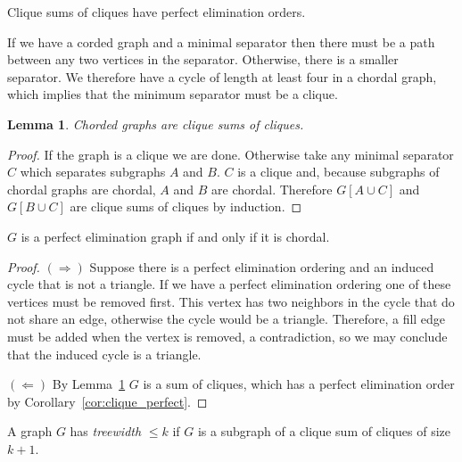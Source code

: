 \documentclass{article}
\newtheorem{lemma}{Lemma}
\begin{document}
\begin{corollary}\label{cor:clique_perfect}
    Clique sums of cliques have perfect elimination orders.
\end{corollary}

If we have a corded graph and a minimal separator then there must be a path between any two vertices in the separator.
Otherwise, there is a smaller separator.
We therefore have a cycle of length at least four in a chordal graph, which implies that the minimum separator must be a clique.

\begin{lemma}\label{lem:chord_sums}
    Chorded graphs are clique sums of cliques.
\end{lemma}
\begin{proof}
    If the graph is a clique we are done.
    Otherwise take any minimal separator $C$ which separates subgraphs $A$ and $B$.
    $C$ is a clique and, because subgraphs of chordal graphs are chordal, $A$ and $B$ are chordal.
    Therefore $G[A\cup C]$ and $G[B\cup C]$ are clique sums of cliques by induction.
\end{proof}

\begin{theorem}
    $G$ is a perfect elimination graph if and only if it is chordal.
\end{theorem}
\begin{proof}
    \noindent
    $(\Rightarrow)$ Suppose there is a perfect elimination ordering and an induced cycle that is not a triangle.
    If we have a perfect elimination ordering one of these vertices must be removed first.
    This vertex has two neighbors in the cycle that do not share an edge, otherwise the cycle would be a triangle.
    Therefore, a fill edge must be added when the vertex is removed, a contradiction, so we may conclude that the induced cycle is a triangle.

    \noindent
    $(\Leftarrow)$ By Lemma~\ref{lem:chord_sums} $G$ is a sum of cliques, which has a perfect elimination order by Corollary~\ref{cor:clique_perfect}.
\end{proof}

\begin{definition}
    A graph $G$ has \emph{treewidth} $\leq k$ if $G$ is a subgraph of a clique sum of cliques of size $k+1$.
\end{definition}
\end{document}
